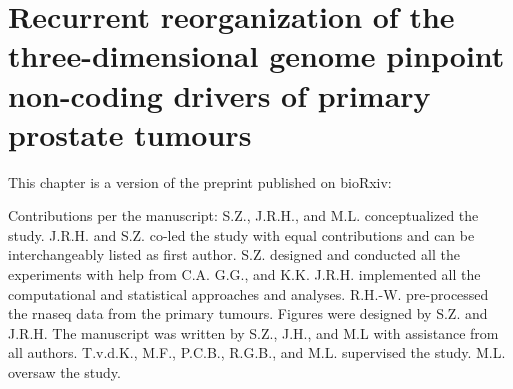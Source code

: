 \chapter{Recurrent reorganization of the three-dimensional genome pinpoint non-coding drivers of primary prostate tumours}
\label{chap:3D}

This chapter is a version of the preprint published on bioRxiv:


\vspace{1em}

Contributions per the manuscript:
S.Z., J.R.H., and M.L. conceptualized the study.
J.R.H. and S.Z. co-led the study with equal contributions and can be interchangeably listed as first author.
S.Z. designed and conducted all the experiments with help from C.A. G.G., and K.K.
J.R.H. implemented all the computational and statistical approaches and analyses.
R.H.-W. pre-processed the \gls{rnaseq} data from the primary tumours.
Figures were designed by S.Z. and J.R.H.
The manuscript was written by S.Z., J.H., and M.L with assistance from all authors.
T.v.d.K., M.F., P.C.B., R.G.B., and M.L. supervised the study.
M.L. oversaw the study.






